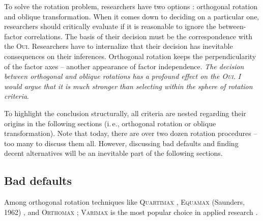 \documentclass[jou, 11pt]{apa7}
\begin{document}
To solve the rotation problem, researchers have two options : orthogonal rotation and oblique transformation.
When it comes down to deciding on a particular one, researchers should critically
evaluate if it is reasonable to ignore the between-factor correlations. The
basis of their decision must be the correspondence with the \textsc{Oui}. Researchers
have to internalize that their decision has inevitable consequences on their
inferences. Orthogonal rotation keeps the perpendicularity of the factor axes
-- another appearance of factor independence. \textit{The decision between
  orthogonal and oblique rotations has a profound effect on the \textsc{Oui}. I
would argue that it is much stronger than selecting within the sphere of
rotation criteria}. 

To highlight the conclusion structurally, all criteria are nested regarding
their origins in the following sections (i.\,e., orthogonal rotation or oblique
transformation). Note that today, there are over two dozen rotation procedures
\parencite[pp. 214]{Gorsuch2015} -- too many to discuss them all. However,
discussing bad defaults and finding decent alternatives will be an inevitable
part of the following sections.

\subsection{Bad defaults}

Among orthogonal rotation techniques like \textsc{Quartimax}
\parencite{Carroll1953}, \textsc{Equamax} (Saunders, 1962) , and
\textsc{Orthomax} \parencite{Harman1970}; \textsc{Varimax}
\parencite[]{Kaiser1958} is the most popular choice in applied research
\parencite{Costello2005, Ford1986, Loo1979}.
\end{document}
